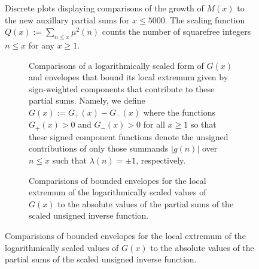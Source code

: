 \documentclass[11pt,reqno,a4letter]{article}
\numberwithin{equation}{section}
\numberwithin{figure}{section}
\numberwithin{table}{section}
\theoremstyle{plain}
\numberwithin{theorem}{section}
\theoremstyle{definition}
\begin{document}
\begin{figure}[ht!]
\caption{Discrete plots displaying comparisons of the growth of $M(x)$ to the new auxillary partial sums for $x \leq 5000$. 
         The scaling function $Q(x) := \sum_{n \leq x} \mu^2(n)$ counts the number of squarefree integers $n \leq x$ for any 
         $x \geq 1$. }
\label{figure_MxAndNewAuxPartialSums_Comparison_Intro_v2_v1} 

\end{figure} 

\begin{figure}[ht!]

\captionsetup{singlelinecheck=off}
\centering

\begin{subfigure}[t!]{0.85\textwidth}
\caption{Comparisons of a logarithmically scaled form of $G(x)$ and envelopes that bound its local 
         extremum given by sign-weighted components that contribute to these partial sums. 
         Namely, we define $G(x) := G_{+}(x) - G_{-}(x)$ where the functions 
         $G_{+}(x) > 0$ and $G_{-}(x) > 0$ for all $x \geq 1$ 
         so that these signed component functions denote the unsigned contributions of only those summands 
         $|g(n)|$ over $n \leq x$ such that $\lambda(n) = \pm 1$, respectively.}
\end{subfigure}

\medskip

\begin{subfigure}[t!]{0.85\textwidth}
\caption{Comparisions of bounded envelopes for the local extremum of the logarithmically scaled values of 
         $G(x)$ to the absolute values of the partial sums of the scaled unsigned inverse function. }
\end{subfigure}


\end{figure}
\end{document}
